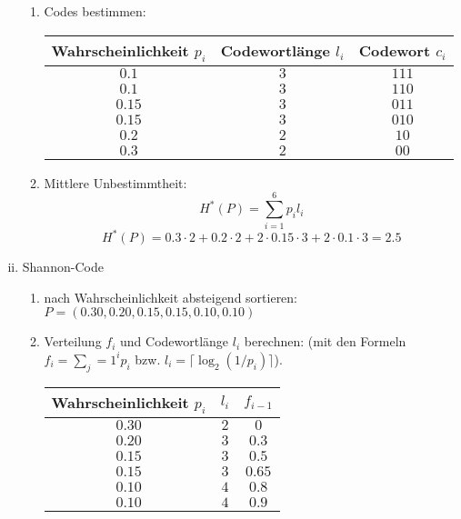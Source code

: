 \documentclass{scrreprt}
\begin{document}
\begin{uebsp}
\begin{Answer}
\begin{enumerate}[i)]
\begin{enumerate}[1)]
        \item Codes bestimmen:
            \begin{center}
            \begin{tabular}{ccc}
                \hline
                Wahrscheinlichkeit $p_i$&Codewortlänge $l_i$ & Codewort $c_i$\\
                \hline
                $0.1$  & $3$ & $111$\\
                $0.1$  & $3$ & $110$\\
                $0.15$ & $3$ & $011$\\
                $0.15$ & $3$ & $010$\\
                $0.2$  & $2$ & $10$\\
                $0.3$  & $2$ & $00$\\
                \hline
            \end{tabular}
            \end{center}
        \item Mittlere Unbestimmtheit:
            \[H^*(P)=\sum_{i=1}^6p_il_i\]
            \[H^*(P)=0.3\cdot 2+0.2\cdot 2+2\cdot 0.15\cdot 3+2\cdot 0.1\cdot 3=2.5\]
    \end{enumerate}
    \item Shannon-Code
        \begin{enumerate}[1)]
            \item nach Wahrscheinlichkeit absteigend sortieren:\\
                $P=(0.30,0.20,0.15,0.15,0.10,0.10)$
            \item Verteilung $f_i$ und Codewortlänge $l_i$ berechnen: (mit den Formeln $f_i=\sum_j=1^i p_i$  bzw. $l_i=\lceil\log_2(1/p_i)\rceil$).
                \begin{center}
                    \begin{tabular}{ccc}
                        \hline
                        Wahrscheinlichkeit $p_i$&$l_i$ & $f_{i-1}$\\
                        \hline
                        $0.30$ & $2$ & $0$\\
                        $0.20$ & $3$ & $0.3$\\
                        $0.15$ & $3$ & $0.5$\\
                        $0.15$ & $3$ & $0.65$\\
                        $0.10$ & $4$ & $0.8$\\
                        $0.10$ & $4$ & $0.9$\\

\end{tabular}
\end{center}
\end{enumerate}
\end{enumerate}
\end{Answer}
\end{uebsp}
\end{document}
